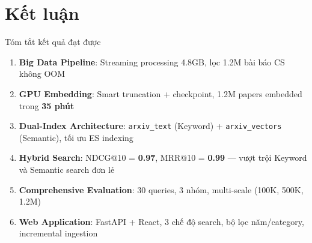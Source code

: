 \section{Kết luận}

\begin{frame}{Tóm tắt kết quả đạt được}
\begin{enumerate}
    \item[\textcolor{accentTeal}{\cmark}] \textbf{Big Data Pipeline}: Streaming processing 4.8GB, lọc 1.2M bài báo CS không OOM

    \vspace{0.15cm}
    \item[\textcolor{accentTeal}{\cmark}] \textbf{GPU Embedding}: Smart truncation + checkpoint, 1.2M papers embedded trong \textbf{35 phút}

    \vspace{0.15cm}
    \item[\textcolor{accentTeal}{\cmark}] \textbf{Dual-Index Architecture}: \texttt{arxiv\_text} (Keyword) + \texttt{arxiv\_vectors} (Semantic), tối ưu ES indexing

    \vspace{0.15cm}
    \item[\textcolor{accentTeal}{\cmark}] \textbf{Hybrid Search}: NDCG@10 = \textcolor{accentTeal}{\textbf{0.97}}, MRR@10 = \textcolor{accentTeal}{\textbf{0.99}} --- vượt trội Keyword và Semantic search đơn lẻ

    \vspace{0.15cm}
    \item[\textcolor{accentTeal}{\cmark}] \textbf{Comprehensive Evaluation}: 30 queries, 3 nhóm, multi-scale (100K, 500K, 1.2M)

    \vspace{0.15cm}
    \item[\textcolor{accentTeal}{\cmark}] \textbf{Web Application}: FastAPI + React, 3 chế độ search, bộ lọc năm/category, incremental ingestion
\end{enumerate}
\end{frame}

